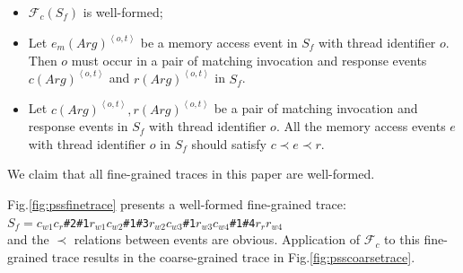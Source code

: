 \documentclass[runningheads]{llncs}
\newcommand{\ecall}{\mathsf{C}}
\newcommand{\eresp}{\mathsf{R}}
\begin{document}

\begin{itemize}
  \item $\mathcal{F}_c(S_f)$ is well-formed;
\item Let $e_m(\mathit{Arg})^{\left\langle o,t\right\rangle}$ be a memory access event in $S_f$ with thread identifier $o$. Then $o$ must occur in a pair of matching invocation and response events $c(\mathit{Arg})^{\left\langle o,t\right\rangle}$ and $r(\mathit{Arg})^{\left\langle o,t\right\rangle}$ in $S_f$.
  \item Let $c(\mathit{Arg})^{\left\langle o,t\right\rangle}, r(\mathit{Arg})^{\left\langle o,t\right\rangle}$ be a pair of matching invocation and response events in $S_f$ with thread identifier $o$. 
  All the memory access events $e$ with thread identifier $o$ in $S_f$ should satisfy $c\prec e\prec r$.
\end{itemize}
\noindent We claim that all fine-grained traces in this paper are well-formed.

%


\begin{example}
Fig.\ref{fig:pssfinetrace} presents a well-formed fine-grained trace:\\
 \quad\quad\quad\quad$S_f = c_{w1}c_r$\texttt{\#2\#1}$r_{w1}c_{w2}$\texttt{\#1\#3}$r_{w2}c_{w3}$\texttt{\#1}$r_{w3}c_{w4}$\texttt{\#1\#4}$r_{r}r_{w4}$\\
and the $\prec$ relations between events are obvious. 
Application of $\mathcal{F}_{c}$ to this fine-grained trace results in the coarse-grained trace in Fig.\ref{fig:psscoarsetrace}.
\end{example}
\end{document}
